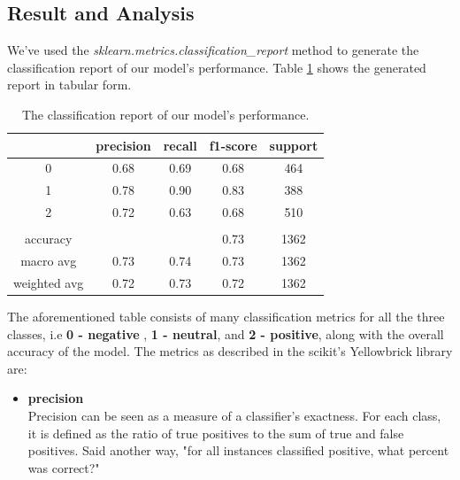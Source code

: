 \documentclass[a4paper, 12pt]{article}
\begin{document}
\begin{sloppypar}
  \subsection{Result and Analysis}
  
  We've used the \textit{sklearn.metrics.classification\_report} method to generate the classification report of our model's performance. Table \ref{report} shows the generated report in tabular form. 
  \begin{table}[H]
  \begin{center}
\begin{tabular}{|c|c|c|c|c|}
\hline
             & precision & recall & f1-score & support \\
             \hline
             \hline
0            & 0.68      & 0.69   & 0.68     & 464     \\
\hline
1            & 0.78      & 0.90   & 0.83     & 388     \\
\hline
2            & 0.72      & 0.63   & 0.68     & 510     \\
\hline
             &           &        &          &         \\
             \hline
accuracy     &           &        & 0.73     & 1362    \\
\hline
macro avg    & 0.73      & 0.74   & 0.73     & 1362    \\
\hline
weighted avg & 0.72      & 0.73   & 0.72     & 1362   \\
\hline
\end{tabular}
  \end{center}
  \caption{The classification report of our model's performance.\label{report}}
\end{table}

The aforementioned table consists of many classification metrics for all the three classes, i.e \textbf{0 - negative} , \textbf{1 - neutral}, and \textbf{2 - positive}, along with the overall accuracy of the model. The metrics as described in the scikit's Yellowbrick library are:
\begin{itemize}
\item{\textbf{precision} \\ 
Precision can be seen as a measure of a classifier's exactness. For each class, it is defined as the ratio of true positives to the sum of true and false positives. Said another way, "for all instances classified positive, what percent was correct?"\cite{noauthor_classification_nodate}}


\end{itemize}
\end{sloppypar}
\end{document}
